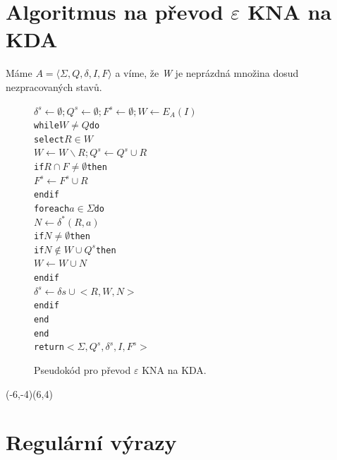 \documentclass[10pt, a4paper, titlepage]{article}
\theoremstyle{note}
\begin{document}
\section{Algoritmus na převod $\varepsilon$ KNA na KDA}

Máme $A = \langle \Sigma, Q, \delta, I, F \rangle$ a víme, že \emph{W} je neprázdná množina dosud nezpracovaných stavů.

\begin{figure}[h]
\begin{alltt}
\( \delta^{s} \leftarrow \emptyset; Q^{s} \leftarrow \emptyset; F^{s} \leftarrow \emptyset; W \leftarrow E_{A}(I) \)
while \( W \neq Q \) do
     select \( R \in W \)
     \( W \leftarrow W \smallsetminus {R}; Q^{s} \leftarrow Q^{s} \cup {R} \)
     if \( R \cap F \neq \emptyset \) then
         \( F^{s} \leftarrow F^{s} \cup {R} \)
     endif
     foreach \( a \in \Sigma \) do
         \( N \leftarrow \delta^{*}(R, a) \)
         if \( N \neq \emptyset \) then
             if \( N \notin W \cup Q^{s} \) then
                 \( W \leftarrow W \cup {N} \)
             endif
             \( \delta^{s} \leftarrow \delta{s} \cup {<R, W, N>} \)
         endif
     end
end
return \( <\Sigma, Q^{s}, \delta^{s}, I, F^{s}> \)
\end{alltt}
\caption{Pseudokód pro převod $\varepsilon$ KNA na KDA.}
\end{figure}

\begin{center}
\begin{VCPicture}{(-6,-4)(6,4)}



\end{VCPicture}
\end{center}

\section{Regulární výrazy}
\end{document}
